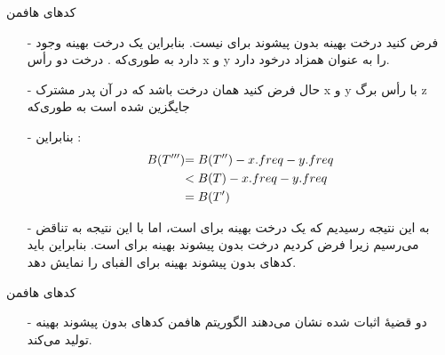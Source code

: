 \begin{frame}{‌کدهای هافمن}
\begin{itemize}\itemr
\item[-]
فرض کنید
درخت بهینه بدون پیشوند برای
نیست. بنابراین یک درخت
بهینه وجود دارد به طوری‌که
.
درخت
دو رأس x و y را به عنوان همزاد درخود دارد.
\item[-]
حال فرض کنید
همان درخت
باشد که در آن پدر مشترک x و y با رأس برگ z جایگزین شده است به طوری‌که
\item[-]
بنابراین :
\begin{align*}
\mathnormal{B(T''')} & \mathnormal{= B(T'') - x.freq - y.freq}\\
& \mathnormal{< B(T) - x.freq - y.freq}\\
& \mathnormal{= B(T')}
\end{align*}
\item[-]
به این نتیجه رسیدیم که 
یک درخت بهینه برای 
است، اما با این نتیجه 
 به تناقض می‌رسیم زیرا فرض کردیم
درخت بدون پیشوند بهینه برای
است. بنابراین
باید کدهای بدون پیشوند بهینه برای الفبای
را نمایش دهد.
\end{itemize}
\end{frame}


\begin{frame}{‌کدهای هافمن}
\begin{itemize}\itemr
\item[-]
دو قضیهٔ اثبات شده نشان می‌دهند الگوریتم هافمن کدهای بدون پیشوند بهینه تولید می‌کند.
\end{itemize}
\end{frame}
